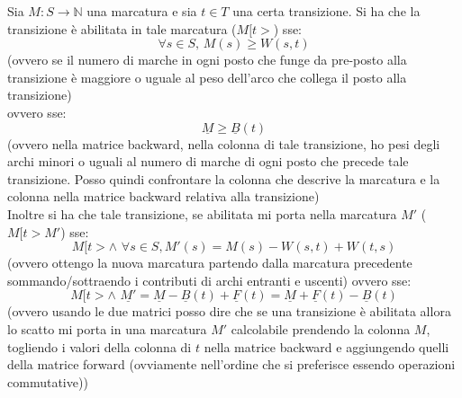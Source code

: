 \documentclass[a4paper,12pt, oneside]{book}
\begin{document}
\begin{definizione}
  Sia $M:S\to\mathbb{N}$ una marcatura e sia $t\in T$ una certa transizione. Si
  ha che la transizione è abilitata in tale marcatura ($M[t>$) sse:
  \[\forall s\in S,\,M(s)\geq W(s,t)\]
  (ovvero se il numero di marche in ogni posto che funge da pre-posto alla
  transizione è maggiore o uguale al peso dell'arco che collega il posto alla
  transizione) \\
  ovvero sse:
  \[\underline{M}\geq \underline{B}(t)\]
  (ovvero nella matrice backward, nella colonna di tale transizione, ho pesi
  degli archi minori o uguali al numero di marche di ogni posto che precede tale
  transizione. Posso quindi confrontare la colonna che descrive la marcatura e
  la colonna nella matrice backward relativa alla transizione)\\
  Inoltre si ha che tale transizione, se abilitata mi porta nella marcatura $M'$
  ($M[t>M'$) sse:
  \[M[t > \wedge \,\,\forall s \in S, M'(s) = M(s) − W (s, t) + W (t, s)\]
  (ovvero ottengo la nuova marcatura partendo dalla marcatura precedente 
  sommando/sottraendo i contributi di archi entranti e uscenti)
  ovvero sse:
  \[M[t > \wedge\,\, \underline{M'} = \underline{M} − \underline{B}(t) +
    \underline{F} (t) = \underline{M} + \underline{F} (t) − \underline{B}(t)\]
  (ovvero usando le due matrici posso dire che se una transizione è abilitata
  allora lo scatto mi porta in una marcatura $M'$ calcolabile prendendo la
  colonna $M$, togliendo i valori della colonna di $t$ nella matrice backward e
  aggiungendo quelli della matrice forward (ovviamente nell'ordine che si
  preferisce essendo operazioni commutative)) 
\end{definizione}
\newpage
\end{document}
